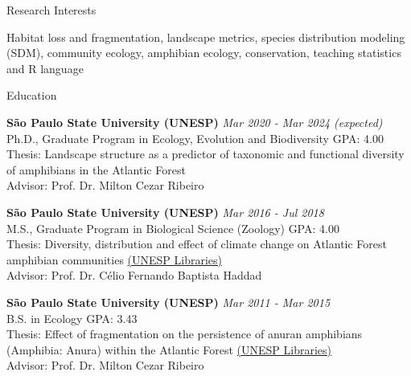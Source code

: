 \documentclass{resume}
\begin{document}

\begin{rSection}{Research Interests}

Habitat loss and fragmentation, landscape metrics, species distribution modeling (SDM), community ecology, amphibian ecology, conservation, teaching statistics and R language

\end{rSection}


\begin{rSection}{Education}

{\bf São Paulo State University (UNESP)} \hfill {\em Mar 2020 - Mar 2024 (expected)} \\ 
Ph.D., Graduate Program in Ecology, Evolution and Biodiversity \hfill { GPA: 4.00 } \\ 
Thesis: Landscape structure as a predictor of taxonomic and functional diversity of amphibians in the Atlantic Forest \\ 
Advisor: Prof. Dr. Milton Cezar Ribeiro

{\bf São Paulo State University (UNESP)} \hfill {\em Mar 2016 - Jul 2018} \\ 
M.S., Graduate Program in Biological Science (Zoology)\hfill { GPA: 4.00 } \\ 
Thesis: Diversity, distribution and effect of climate change on Atlantic Forest amphibian communities \href{https://repositorio.unesp.br/handle/11449/154993}{(UNESP Libraries)} \\ 
Advisor: Prof. Dr. Célio Fernando Baptista Haddad

{\bf São Paulo State University (UNESP)} \hfill {\em Mar 2011 - Mar 2015} \\ 
B.S. in Ecology\hfill { GPA: 3.43 } \\ 
Thesis: Effect of fragmentation on the persistence of anuran amphibians (Amphibia: Anura) within the Atlantic Forest \href{https://repositorio.unesp.br/handle/11449/138991}{(UNESP Libraries)} \\ 
Advisor: Prof. Dr. Milton Cezar Ribeiro

\end{rSection}
\end{document}
